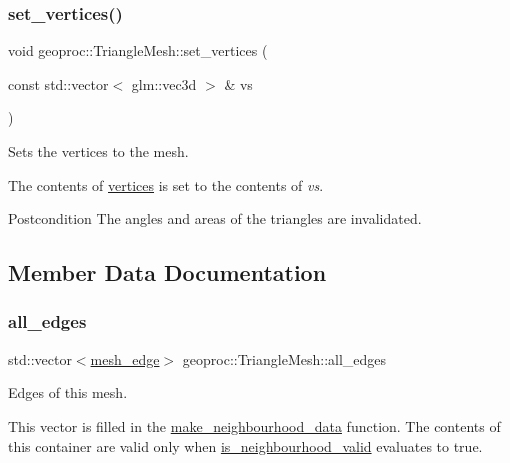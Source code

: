 \subsubsection{\texorpdfstring{set\+\_\+vertices()}{set\_vertices()}\hspace{0.1cm}{\footnotesize\ttfamily [3/3]}}
{\footnotesize\ttfamily void geoproc\+::\+Triangle\+Mesh\+::set\+\_\+vertices (\begin{DoxyParamCaption}\item[{const std\+::vector$<$ glm\+::vec3d $>$ \&}]{vs }\end{DoxyParamCaption})}



Sets the vertices to the mesh. 

The contents of \hyperlink{classgeoproc_1_1TriangleMesh_a72052fc497d349c48966b937e5e3e834}{vertices} is set to the contents of {\itshape vs}.

\begin{DoxyPostcond}{Postcondition}
The angles and areas of the triangles are invalidated. 
\end{DoxyPostcond}


\subsection{Member Data Documentation}
\mbox{\label{classgeoproc_1_1TriangleMesh_ab10f052ad932cd78056a55b58ddd475c}} 
\subsubsection{\texorpdfstring{all\+\_\+edges}{all\_edges}}
{\footnotesize\ttfamily std\+::vector$<$\hyperlink{classgeoproc_1_1mesh__edge}{mesh\+\_\+edge}$>$ geoproc\+::\+Triangle\+Mesh\+::all\+\_\+edges\hspace{0.3cm}{\ttfamily [protected]}}



Edges of this mesh. 

This vector is filled in the \hyperlink{classgeoproc_1_1TriangleMesh_a84003dfdfd5e591c00f01a797578ff1f}{make\+\_\+neighbourhood\+\_\+data} function. The contents of this container are valid only when \hyperlink{classgeoproc_1_1TriangleMesh_aa6f95b95709a72a14a15638bfeeed3f9}{is\+\_\+neighbourhood\+\_\+valid} evaluates to true.

